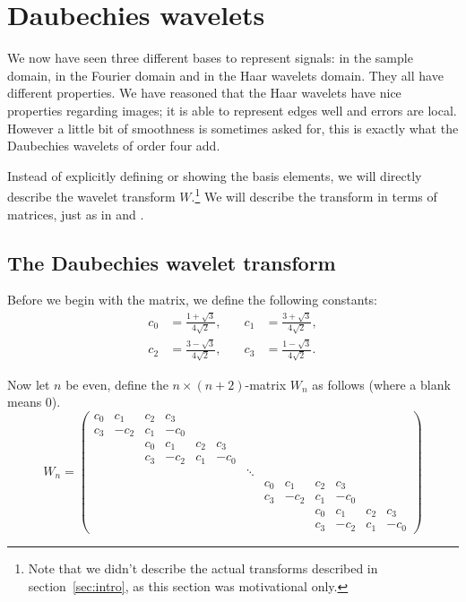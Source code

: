 
\section{Daubechies wavelets}
\label{sec:dau}
We now have seen three different bases to represent signals: in the sample domain, in the Fourier domain and in the Haar wavelets domain. They all have different properties. We have reasoned that the Haar wavelets have nice properties regarding images; it is able to represent edges well and errors are local. However a little bit of smoothness is sometimes asked for, this is exactly what the Daubechies wavelets of order four add.

Instead of explicitly defining or showing the basis elements, we will directly describe the wavelet transform $W$.\footnote{Note that we didn't describe the actual transforms described in section~\ref{sec:intro}, as this section was motivational only.} We will describe the transform in terms of matrices, just as in \cite{numc} and \cite{biss}.


\subsection{The Daubechies wavelet transform}
Before we begin with the matrix, we define the following constants:
\begin{align*}
	c_0 &= \frac{1 + \sqrt{3}}{4 \sqrt{2}}, &\quad
	c_1 &= \frac{3 + \sqrt{3}}{4 \sqrt{2}}, \\
	c_2 &= \frac{3 - \sqrt{3}}{4 \sqrt{2}}, &\quad
	c_3 &= \frac{1 - \sqrt{3}}{4 \sqrt{2}}.
\end{align*}

Now let $n$ be even, define the $n \times (n+2)$-matrix $W_n$ as follows (where a blank means $0$).
\[ W_n =
\begin{pmatrix}
	c_0 &  c_1 & c_2 &  c_3 &     &      & & & & & & & \\
	c_3 & -c_2 & c_1 & -c_0 &     &      & & & & & & & \\
	    &      & c_0 &  c_1 & c_2 &  c_3 & & & & & & & \\
	    &      & c_3 & -c_2 & c_1 & -c_0 & & & & & & & \\

	& & & & & & \ddots & & & & & & \\

	& & & & & & & c_0 &  c_1 & c_2 &  c_3 &     &      \\
	& & & & & & & c_3 & -c_2 & c_1 & -c_0 &     &      \\
	& & & & & & &     &      & c_0 &  c_1 & c_2 &  c_3 \\
	& & & & & & &     &      & c_3 & -c_2 & c_1 & -c_0
\end{pmatrix} \]

